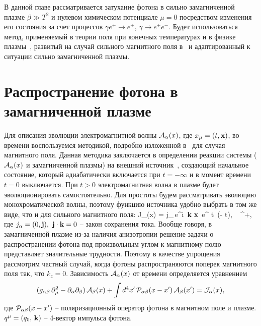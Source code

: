 В данной главе рассматривается затухание фотона в сильно замагниченной плазме $\beta \gg T^2$
 и нулевом химическом потенциале $\mu = 0$ посредством изменения его состояния за счет процессов $\gamma e^\pm\to e^\pm$, $\gamma \to e^+e^-$. Будет использоваться метод, применяемый в теории поля при конечных температурах и в физике плазмы~\cite{Boyan}, развитый на случай сильного магнитного поля в~\cite{MikhChist:2001} и адаптированный к ситуации сильно замагниченной плазмы.

\section{Распространение фотона в замагниченной плазме}

Для описания эволюции электромагнитной волны ${\cal A}_{\alpha}(x)$, где $x_\mu = (t, {\bf x})$, 
во времени воспользуемся методикой, подробно изложенной в~\cite{MikhChist:2001} для случая магнитного поля. Данная методика заключается в определении реакции системы 
(${\cal A}_{\alpha}(x)$ и замагниченной плазмы) на внешний источник~\cite{Kirzhnits:1987}, создающий начальное состояние, который адиабатически включается 
при $t = - \infty$ и в момент времени $t = 0$ выключается. При $t > 0$
электромагнитная волна в плазме будет эволюционировать самостоятельно. Для простоты будем рассматривать эволюцию монохроматической волны, поэтому 
функцию источника удобно выбрать в том же виде, что и для сильного магнитного поля:
%
\beq
{\cal J}_{\alpha}(x) = j_{\alpha}\,e^{i \,{\bf k} {\bf x}}\,
e^{ \varepsilon t}\, \theta(- t), \,\,\, \varepsilon {}^+,
\label{eq:1}
\eeq
где $j_{\alpha} = (0, {\bf j}),\,\,{\bf j} \cdot {\bf k} = 0$ – закон сохранения тока. Вообще говоря, в замагниченной плазме из-за наличия анизотропии решение задачи о распространении фотона под произвольным углом к магнитному полю представляет значительные трудности. Поэтому в качестве упрощения рассмотрим частный случай, когда фотоны распространяются поперек магнитного поля так, что $k_z=0$. Зависимость ${\cal A}_{\alpha}(x)$ от времени  определяется уравнением
%
\begin{eqnarray}\label{eq:WaveEq}
(g_{\alpha \beta} \, \partial_{\mu}^2  -
\partial_{\alpha}\partial_{\beta}) \, {\cal A}_{\beta}(x) + 
\int d^4 x'\, {\cal P}_{\alpha \beta} (x - x') \, {\cal A}_{\beta}(x')
= {\cal J}_{\alpha}(x),
\label{eq:2}
\end{eqnarray}
где ${\cal P}_{\alpha \beta} (x - x')$ -- поляризационный оператор фотона в магнитном поле и плазме. $q^{\mu} = (q_0,\, {\bf k})$ -- 4-вектор импульса фотона.

